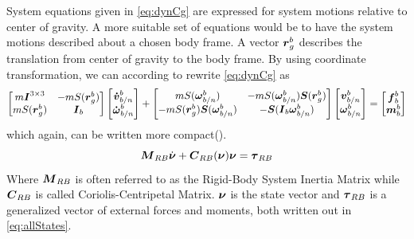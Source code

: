 System equations given in \ref{eq:dynCg} are expressed for system motions relative to center of gravity. A more suitable set of equations would be to have the system motions described about a chosen body frame.
A vector $\boldsymbol{r}_g^b$ describes the translation from center of gravity to the body frame. By using coordinate transformation, we can according to \cite{Fossen2011} rewrite \ref{eq:dynCg} as
\begin{equation}
  \begin{bmatrix}
    m\boldsymbol{I}^{3 \times 3} & -mS(\boldsymbol{r}_g^b)\\
    mS(\boldsymbol{r}_g^b) & \boldsymbol{I}_{b}
  \end{bmatrix}	
  \begin{bmatrix}
    \boldsymbol{\dot{v}}_{b/n}^{b}\\
    \boldsymbol{\dot{\omega}}_{b/n}^{b}
  \end{bmatrix}
  +
  \begin{bmatrix}
    mS(\boldsymbol{\omega}^{b}_{b/n}) & -mS(\boldsymbol{\omega}^{b}_{b/n})\boldsymbol{S}(\boldsymbol{r}_{g}^{b})\\
    -mS(\boldsymbol{r}_{g}^{b})\boldsymbol{S}(\boldsymbol{\omega}^{b}_{b/n}) & -\boldsymbol{S}(\boldsymbol{I}_{b}\boldsymbol{\omega}^{b}_{b/n})
  \end{bmatrix}	
  \begin{bmatrix}
    \boldsymbol{v}_{b/n}^{b}\\
    \boldsymbol{\omega}_{b/n}^{b}
  \end{bmatrix}
  =
  \begin{bmatrix}
    \boldsymbol{f}_{b}^{b}\\
    \boldsymbol{m}_{b}^{b}
  \end{bmatrix}
\end{equation}
which again, can be written more compact(\cite{Fossen2011}).
\begin{equation}
  \boldsymbol{M}_{RB}\dot{\boldsymbol{\nu}}+\boldsymbol{C}_{RB}(\boldsymbol{\nu})\boldsymbol{\nu}=\boldsymbol{\tau}_{RB}
\end{equation}
Where $\boldsymbol{M}_{RB}$ is often referred to as the Rigid-Body System Inertia Matrix while $\boldsymbol{C}_{RB}$ is called Coriolis-Centripetal Matrix. $\boldsymbol{\nu}$ is the state vector and $\boldsymbol{\tau}_{RB}$ is a generalized vector of 
external forces and moments, both written out in \ref{eq:allStates}.

